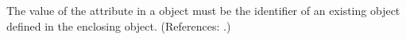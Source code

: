 The value of the attribute  in a \Species object must be
the identifier of an existing \Compartment object defined in the enclosing
\Model object.  (References: .)
